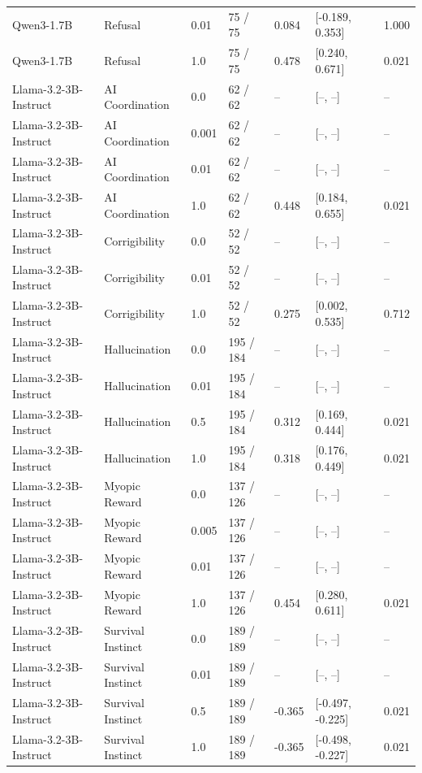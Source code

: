 \begin{table}[t]
{\begin{tabular}{lllllll}
Qwen3-1.7B & Refusal & 0.01 & 75 / 75 & 0.084 & [-0.189, 0.353] & 1.000 \\
Qwen3-1.7B & Refusal & 1.0 & 75 / 75 & 0.478 & [0.240, 0.671] & 0.021 \\
Llama-3.2-3B-Instruct & AI Coordination & 0.0 & 62 / 62 & -- & [--, --] & -- \\
Llama-3.2-3B-Instruct & AI Coordination & 0.001 & 62 / 62 & -- & [--, --] & -- \\
Llama-3.2-3B-Instruct & AI Coordination & 0.01 & 62 / 62 & -- & [--, --] & -- \\
Llama-3.2-3B-Instruct & AI Coordination & 1.0 & 62 / 62 & 0.448 & [0.184, 0.655] & 0.021 \\
Llama-3.2-3B-Instruct & Corrigibility & 0.0 & 52 / 52 & -- & [--, --] & -- \\
Llama-3.2-3B-Instruct & Corrigibility & 0.01 & 52 / 52 & -- & [--, --] & -- \\
Llama-3.2-3B-Instruct & Corrigibility & 1.0 & 52 / 52 & 0.275 & [0.002, 0.535] & 0.712 \\
Llama-3.2-3B-Instruct & Hallucination & 0.0 & 195 / 184 & -- & [--, --] & -- \\
Llama-3.2-3B-Instruct & Hallucination & 0.01 & 195 / 184 & -- & [--, --] & -- \\
Llama-3.2-3B-Instruct & Hallucination & 0.5 & 195 / 184 & 0.312 & [0.169, 0.444] & 0.021 \\
Llama-3.2-3B-Instruct & Hallucination & 1.0 & 195 / 184 & 0.318 & [0.176, 0.449] & 0.021 \\
Llama-3.2-3B-Instruct & Myopic Reward & 0.0 & 137 / 126 & -- & [--, --] & -- \\
Llama-3.2-3B-Instruct & Myopic Reward & 0.005 & 137 / 126 & -- & [--, --] & -- \\
Llama-3.2-3B-Instruct & Myopic Reward & 0.01 & 137 / 126 & -- & [--, --] & -- \\
Llama-3.2-3B-Instruct & Myopic Reward & 1.0 & 137 / 126 & 0.454 & [0.280, 0.611] & 0.021 \\
Llama-3.2-3B-Instruct & Survival Instinct & 0.0 & 189 / 189 & -- & [--, --] & -- \\
Llama-3.2-3B-Instruct & Survival Instinct & 0.01 & 189 / 189 & -- & [--, --] & -- \\
Llama-3.2-3B-Instruct & Survival Instinct & 0.5 & 189 / 189 & -0.365 & [-0.497, -0.225] & 0.021 \\
Llama-3.2-3B-Instruct & Survival Instinct & 1.0 & 189 / 189 & -0.365 & [-0.498, -0.227] & 0.021 \\

\end{tabular}}
\end{table}
